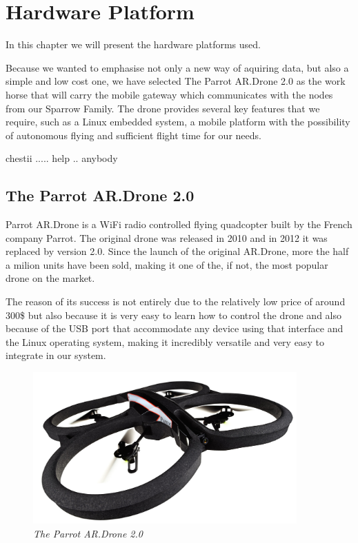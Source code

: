 \normalfont\normalsize
\chapter{Hardware Platform}

In this chapter we will present the hardware platforms used. 

Because we wanted to emphasise not only a new way of aquiring data, but also a simple and low cost one, we have selected The Parrot AR.Drone 2.0 as the work horse that will carry the mobile gateway which communicates with the nodes from our Sparrow Family. The drone provides several key features that we require, such as a Linux embedded system, a mobile platform with the possibility of autonomous flying and sufficient flight time for our needs.


chestii ..... help .. anybody

 

\section{The Parrot AR.Drone 2.0}\cite{parrot2012drone}

Parrot AR.Drone is a WiFi radio controlled flying quadcopter built by the French company Parrot.
The original drone was released in 2010 and in 2012 it was replaced by version 2.0. Since the launch of the original AR.Drone, more the half a milion units have been sold, making it one of the, if not, the most popular drone on the market.\cite{parrotpopular}

The reason of its success is not entirely due to the relatively low price of around 300\$ but also because it is very easy to learn how to control the drone and also because of the USB port that accommodate any device using that interface and the Linux operating system, making it incredibly versatile and very easy to integrate in our system.


\begin{figure}[ht]
\begin{center}
\includegraphics[width=0.9\textwidth]{hw_platform/drone.jpg}
\end{center}
\caption{\small \itshape{The Parrot AR.Drone 2.0}}
\end{figure}


